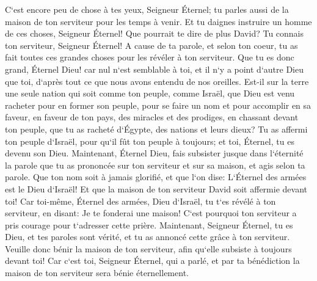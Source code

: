 \verse C`est encore peu de chose à tes yeux, Seigneur Éternel; tu parles aussi de la maison de ton serviteur pour les temps à venir. Et tu daignes instruire un homme de ces choses, Seigneur Éternel! 
\verse Que pourrait te dire de plus David? Tu connais ton serviteur, Seigneur Éternel! 
\verse A cause de ta parole, et selon ton coeur, tu as fait toutes ces grandes choses pour les révéler à ton serviteur. 
\verse Que tu es donc grand, Éternel Dieu! car nul n`est semblable à toi, et il n`y a point d`autre Dieu que toi, d`après tout ce que nous avons entendu de nos oreilles. 
\verse Est-il sur la terre une seule nation qui soit comme ton peuple, comme Israël, que Dieu est venu racheter pour en former son peuple, pour se faire un nom et pour accomplir en sa faveur, en faveur de ton pays, des miracles et des prodiges, en chassant devant ton peuple, que tu as racheté d`Égypte, des nations et leurs dieux? 
\verse Tu as affermi ton peuple d`Israël, pour qu`il fût ton peuple à toujours; et toi, Éternel, tu es devenu son Dieu. 
\verse Maintenant, Éternel Dieu, fais subsister jusque dans l`éternité la parole que tu as prononcée sur ton serviteur et sur sa maison, et agis selon ta parole. 
\verse Que ton nom soit à jamais glorifié, et que l`on dise: L`Éternel des armées est le Dieu d`Israël! Et que la maison de ton serviteur David soit affermie devant toi! 
\verse Car toi-même, Éternel des armées, Dieu d`Israël, tu t`es révélé à ton serviteur, en disant: Je te fonderai une maison! C`est pourquoi ton serviteur a pris courage pour t`adresser cette prière. 
\verse Maintenant, Seigneur Éternel, tu es Dieu, et tes paroles sont vérité, et tu as annoncé cette grâce à ton serviteur. 
\verse Veuille donc bénir la maison de ton serviteur, afin qu`elle subsiste à toujours devant toi! Car c`est toi, Seigneur Éternel, qui a parlé, et par ta bénédiction la maison de ton serviteur sera bénie éternellement. 

\chapter{}

